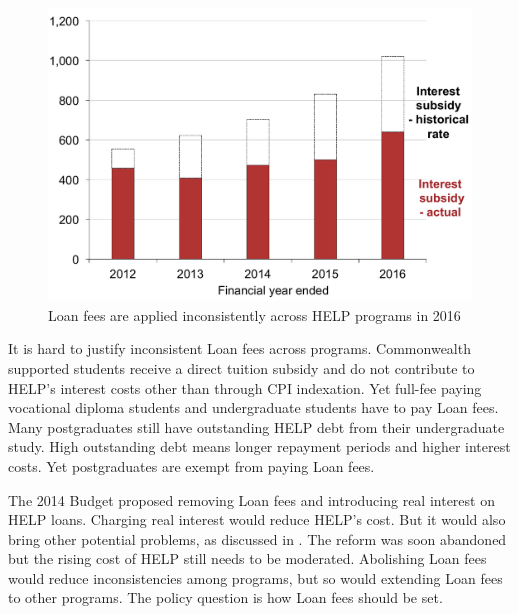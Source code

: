 \documentclass[embargoed]{grattan}
\begin{document}
\begin{figure}
\caption[Loan fees are applied inconsistently across HELP programs in 2016]{\Gls{Loan fees} are applied inconsistently across \gls{HELP} programs in 2016}\label{fig:fig19-loan-fees-are-applied-inconsitently-across-HELP-programs-2016}

\includegraphics[page=19]{atlas/Chartpack.pdf}

\end{figure}

It is hard to justify inconsistent \gls{Loan fees} across programs.
\gls{Commonwealth supported} students receive a direct tuition subsidy and do not contribute to \gls{HELP}'s interest costs other than through \gls{CPI} indexation.
Yet full-fee paying vocational diploma students and undergraduate students have to pay \gls{Loan fees}.
Many postgraduates still have outstanding \gls{HELP} debt from their undergraduate study.
High outstanding debt means longer repayment periods and higher interest costs.
Yet postgraduates are exempt from paying \gls{Loan fees}.

The 2014 Budget proposed removing \gls{Loan fees} and introducing real interest on \gls{HELP} loans.
Charging real interest would reduce \gls{HELP}'s cost.
But it would also bring other potential problems, as discussed in .
The reform was soon abandoned but the rising cost of \gls{HELP} still needs to be moderated.
Abolishing \gls{Loan fees} would reduce inconsistencies among programs, but so would extending \gls{Loan fees} to other programs.
The policy question is how \gls{Loan fees} should be set.
\end{document}

